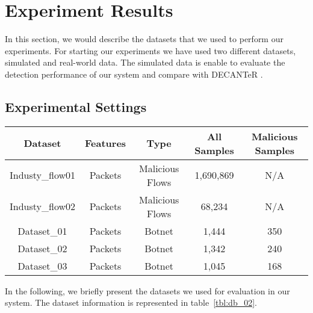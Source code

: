 \section{Experiment Results}

In this section, we would describe the datasets that we used to perform our experiments. For starting our experiments we have used two different datasets, simulated and real-world data. The simulated data is enable to evaluate the detection performance of our system and compare with DECANTeR \cite{bortolameotti2017decanter}.


\subsection{Experimental Settings}

\begin{table*}[!h]
\centering
\caption{Overview of the Datasets}
\label{tbl:db_02}
\begin{tabular}{|c|c|c|c|c|}
\hline\hline
Dataset         & Features & Type            & All Samples & Malicious Samples \\ \hline
Industy\_flow01 & Packets  & Malicious Flows & 1,690,869     & N/A               \\ \hline
Industy\_flow02 & Packets  & Malicious Flows & 68,234       & N/A               \\ \hline
Dataset\_01     & Packets  & Botnet          & 1,444         & 350               \\ \hline
Dataset\_02     & Packets  & Botnet          & 1,342         & 240               \\ \hline
Dataset\_03     & Packets  & Botnet          & 1,045         & 168               \\ \hline\hline
\end{tabular}
\end{table*}


In the following, we briefly present the datasets we used for evaluation in our system. The dataset information is represented in table~\ref{tbl:db_02}.


